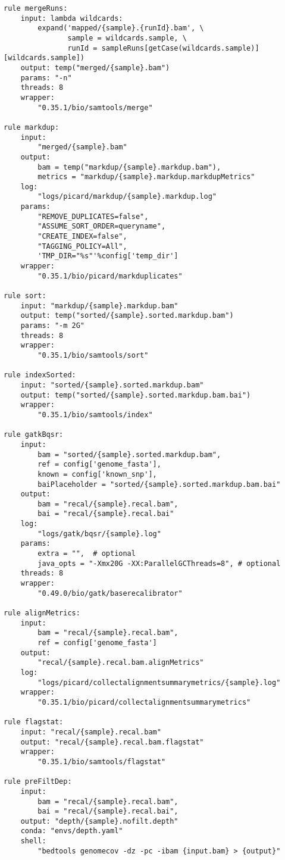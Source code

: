 \documentclass{article}\usepackage[]{graphicx}\usepackage[]{color}
\makeatletter
\newenvironment{kframe}{%
 \def\at@end@of@kframe{}%
 \ifinner\ifhmode%
  \def\at@end@of@kframe{\end{minipage}}%
  \begin{minipage}{\columnwidth}%
 \fi\fi%
 \def\FrameCommand##1{\hskip\@totalleftmargin \hskip-\fboxsep
 \colorbox{shadecolor}{##1}\hskip-\fboxsep
     \hskip-\linewidth \hskip-\@totalleftmargin \hskip\columnwidth}%
 \MakeFramed {\advance\hsize-\width
   \@totalleftmargin\z@ \linewidth\hsize
   \@setminipage}}%
 {\par\unskip\endMakeFramed%
 \at@end@of@kframe}
\newenvironment{knitrout}{}{} %
\makeatother
\begin{document}
\begin{knitrout}
\begin{kframe}
\begin{verbatim}
rule mergeRuns:
    input: lambda wildcards: 
        expand('mapped/{sample}.{runId}.bam', \
               sample = wildcards.sample, \
               runId = sampleRuns[getCase(wildcards.sample)][wildcards.sample])
    output: temp("merged/{sample}.bam")
    params: "-n"
    threads: 8
    wrapper:
        "0.35.1/bio/samtools/merge"

rule markdup:
    input:
        "merged/{sample}.bam"
    output:
        bam = temp("markdup/{sample}.markdup.bam"),
        metrics = "markdup/{sample}.markdup.markdupMetrics"
    log:
        "logs/picard/markdup/{sample}.markdup.log"
    params:
        "REMOVE_DUPLICATES=false",
        "ASSUME_SORT_ORDER=queryname",
        "CREATE_INDEX=false",
        "TAGGING_POLICY=All",
        'TMP_DIR="%s"'%config['temp_dir']
    wrapper:
        "0.35.1/bio/picard/markduplicates"

rule sort:
    input: "markdup/{sample}.markdup.bam"
    output: temp("sorted/{sample}.sorted.markdup.bam")
    params: "-m 2G"
    threads: 8
    wrapper:
        "0.35.1/bio/samtools/sort"

rule indexSorted:
    input: "sorted/{sample}.sorted.markdup.bam"
    output: temp("sorted/{sample}.sorted.markdup.bam.bai")
    wrapper:
        "0.35.1/bio/samtools/index"
        
rule gatkBqsr:
    input:
        bam = "sorted/{sample}.sorted.markdup.bam",
        ref = config['genome_fasta'],
        known = config['known_snp'],
        baiPlaceholder = "sorted/{sample}.sorted.markdup.bam.bai"
    output:
        bam = "recal/{sample}.recal.bam",
        bai = "recal/{sample}.recal.bai"
    log:
        "logs/gatk/bqsr/{sample}.log"
    params:
        extra = "",  # optional
        java_opts = "-Xmx20G -XX:ParallelGCThreads=8", # optional
    threads: 8
    wrapper:
        "0.49.0/bio/gatk/baserecalibrator"

rule alignMetrics:
    input:
        bam = "recal/{sample}.recal.bam",
        ref = config['genome_fasta']
    output:
        "recal/{sample}.recal.bam.alignMetrics"
    log:
        "logs/picard/collectalignmentsummarymetrics/{sample}.log"
    wrapper:
        "0.35.1/bio/picard/collectalignmentsummarymetrics"

rule flagstat:
    input: "recal/{sample}.recal.bam"
    output: "recal/{sample}.recal.bam.flagstat"
    wrapper:
        "0.35.1/bio/samtools/flagstat"

rule preFiltDep:
    input: 
        bam = "recal/{sample}.recal.bam",
        bai = "recal/{sample}.recal.bai",
    output: "depth/{sample}.nofilt.depth"
    conda: "envs/depth.yaml"
    shell:
        "bedtools genomecov -dz -pc -ibam {input.bam} > {output}"


\end{verbatim}
\end{kframe}
\end{knitrout}
\end{document}
